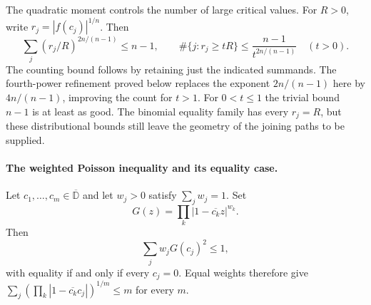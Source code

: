 \documentclass[11pt]{article}
\begin{document}
The quadratic moment controls the number of large critical values.
For $R>0$, write $r_j=|f(c_j)|^{1/n}$. Then
\[
 \sum_j(r_j/R)^{2n/(n-1)}\le n-1,\qquad
 \#\{j:r_j\ge tR\}\le\frac{n-1}{t^{2n/(n-1)}}\quad(t>0).
\]
The counting bound follows by retaining just the indicated summands.
The fourth-power refinement proved below replaces the exponent
$2n/(n-1)$ here by $4n/(n-1)$, improving the count for $t>1$.
For $0<t\le1$ the trivial bound $n-1$ is at least as good.
The binomial equality family has every $r_j=R$, but these distributional
bounds still leave the geometry of the joining paths to be supplied.

\paragraph{The weighted Poisson inequality and its equality case.}
\hypertarget{weighted-poisson-proof}{}
\begin{theorem}
\label{res:fp-weighted-all-degree}
Let $c_1,\ldots,c_m\in\overline{\mathbb D}$ and let $w_j>0$ satisfy
$\sum_j w_j=1$.  Set
\[
 G(z)=\prod_k |1-\overline{c_k}z|^{w_k}.
\]
Then
\[
 \sum_j w_j G(c_j)^2\le 1,
\]
with equality if and only if every $c_j=0$.  Equal weights therefore give
$\sum_j(\prod_k|1-\overline{c_k}c_j|)^{1/m}\le m$ for every $m$.
\end{theorem}
\end{document}
